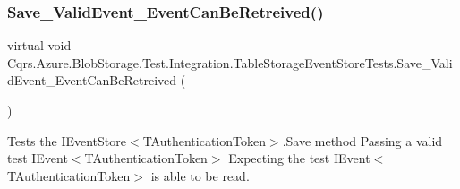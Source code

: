 \subsubsection{\texorpdfstring{Save\+\_\+\+Valid\+Event\+\_\+\+Event\+Can\+Be\+Retreived()}{Save\_ValidEvent\_EventCanBeRetreived()}}
{\footnotesize\ttfamily virtual void Cqrs.\+Azure.\+Blob\+Storage.\+Test.\+Integration.\+Table\+Storage\+Event\+Store\+Tests.\+Save\+\_\+\+Valid\+Event\+\_\+\+Event\+Can\+Be\+Retreived (\begin{DoxyParamCaption}{ }\end{DoxyParamCaption})\hspace{0.3cm}{\ttfamily [virtual]}}



Tests the I\+Event\+Store$<$\+T\+Authentication\+Token$>$.\+Save method Passing a valid test I\+Event$<$\+T\+Authentication\+Token$>$ Expecting the test I\+Event$<$\+T\+Authentication\+Token$>$ is able to be read. 


